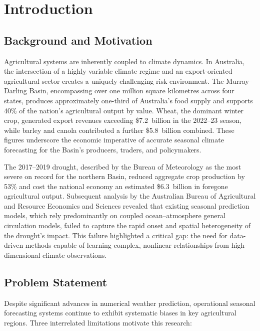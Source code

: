 \documentclass[12pt,a4paper]{report}
\begin{document}
\chapter{Introduction}

\section{Background and Motivation}

Agricultural systems are inherently coupled to climate dynamics. In Australia,
the intersection of a highly variable climate regime and an export-oriented
agricultural sector creates a uniquely challenging risk environment. The
Murray--Darling Basin, encompassing over one million square kilometres across
four states, produces approximately one-third of Australia's food supply and
supports 40\% of the nation's agricultural output by value. Wheat, the dominant
winter crop, generated export revenues exceeding \$7.2~billion in the 2022--23
season, while barley and canola contributed a further \$5.8~billion combined.
These figures underscore the economic imperative of accurate seasonal climate
forecasting for the Basin's producers, traders, and policymakers.

The 2017--2019 drought, described by the Bureau of Meteorology as the most
severe on record for the northern Basin, reduced aggregate crop production by
53\% and cost the national economy an estimated \$6.3~billion in foregone
agricultural output. Subsequent analysis by the Australian Bureau of
Agricultural and Resource Economics and Sciences revealed that existing
seasonal prediction models, which rely predominantly on coupled ocean--atmosphere
general circulation models, failed to capture the rapid onset and spatial
heterogeneity of the drought's impact. This failure highlighted a critical gap:
the need for data-driven methods capable of learning complex, nonlinear
relationships from high-dimensional climate observations.

\section{Problem Statement}

Despite significant advances in numerical weather prediction, operational
seasonal forecasting systems continue to exhibit systematic biases in key
agricultural regions. Three interrelated limitations motivate this research:
\end{document}
